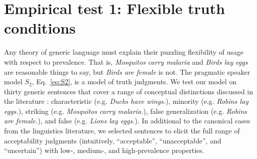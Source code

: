 \documentclass[12pt,letterpaper]{article}
\newcommand{\denote}[1]{\mbox{ $[\![ #1 ]\!]$}}
\newcommand{\ndg}[1]{\textcolor{Green}{[ndg: #1]}}
\begin{document}
%
%
%
%
%




%

\section*{Empirical test 1: Flexible truth conditions}

Any theory of generic language must explain their puzzling flexibility of usage with respect to prevalence.
That is, \emph{Mosquitos carry malaria} and \emph{Birds lay eggs} are reasonable things to say, but \emph{Birds are female} is not.
The pragmatic speaker model $S_2$, Eq.~\ref{eq:S2}, is a model of truth judgments. 
We test our model on thirty generic sentences 
that cover a range of conceptual distinctions discussed in the literature  \cite{Prasada2013}: characteristic (e.g. \emph{Ducks have wings.}), minority (e.g. \emph{Robins lay eggs.}), striking (e.g. \emph{Mosquitos carry malaria.}), false generalization (e.g. \emph{Robins are female.}), and false (e.g. \emph{Lions lay eggs.}).
In additional to the canonical cases from the linguistics literature, we selected sentences to elicit the full range of acceptability judgments (intuitively, ``acceptable'', ``unacceptable'', and ``uncertain'') with low-, medium-, and high-prevalence properties. 
\end{document}
